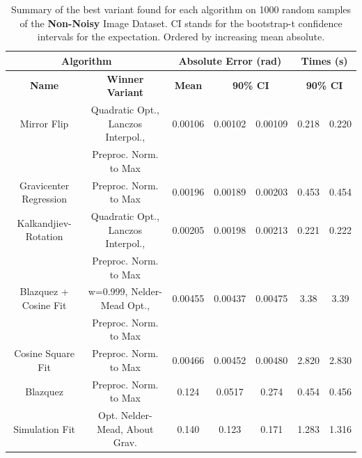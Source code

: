 \documentclass[11pt, a4paper, twoside]{article} %
\begin{document}
\begin{table}[h!]
\caption{Summary of the best variant found for each algorithm on 1000 random samples of the {\bf Non-Noisy} Image Dataset. CI stands for the bootstrap-t confidence intervals for the expectation. Ordered by increasing mean absolute.}\label{tab:nonnoisy}
\hspace{-0.6cm}\begin{tabular}{c|c|c|cc|cc}
\toprule
\multicolumn{2}{c|}{\bf Algorithm} &  \multicolumn{3}{|c|}{\bf Absolute Error (rad)} & \multicolumn{2}{|c}{\bf Times (s)} \\ \midrule \midrule
{\bf                     Name} &                          {\bf Winner} {\bf Variant} &  {\bf Mean} &  \multicolumn{2}{c|}{\bf 90\% CI } &  \multicolumn{2}{|c}{\bf 90\% CI }\\
\bottomrule\rule{0pt}{4mm}{}
           Mirror Flip & Quadratic Opt., Lanczos Interpol.,  & 0.00106 &    0.00102 &   0.00109 &        0.218 &       0.220 \\
                       &               Preproc. Norm. to Max &         &            &           &              &             \\ \hline\rule{0pt}{4mm}{}
Gravicenter Regression &               Preproc. Norm. to Max & 0.00196 &    0.00189 &   0.00203 &        0.453 &       0.454 \\ \hline\rule{0pt}{4mm}{}
  Kalkandjiev-Rotation &  Quadratic Opt., Lanczos Interpol., & 0.00205 &    0.00198 &   0.00213 &        0.221 &       0.222 \\
                       &               Preproc. Norm. to Max &         &            &           &              &             \\ \hline\rule{0pt}{4mm}{}
 Blazquez + Cosine Fit &         w=0.999, Nelder-Mead Opt.,  & 0.00455 &    0.00437 &   0.00475 &        3.38 &       3.39 \\
                       &               Preproc. Norm. to Max &         &            &           &              &             \\ \hline\rule{0pt}{4mm}{}
     Cosine Square Fit &               Preproc. Norm. to Max & 0.00466 &    0.00452 &   0.00480 &        2.820 &       2.830 \\ \hline\rule{0pt}{4mm}{}
              Blazquez &               Preproc. Norm. to Max & 0.124 &    0.0517 &   0.274 &        0.454 &       0.456 \\ \hline\rule{0pt}{4mm}{}
              Simulation Fit	& Opt. Nelder-Mead, About Grav.&	0.140	 & 0.123	& 0.171&	1.283	&1.316\\ 

\end{tabular}
\end{table}
\end{document}
